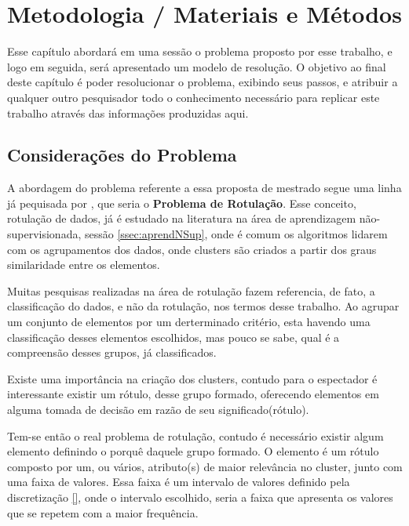 \chapter{Metodologia / Materiais e Métodos}\label{cap:ferramentas}
Esse capítulo abordará em uma sessão o problema proposto por esse trabalho, e logo em seguida, será apresentado um modelo de resolução. O objetivo ao final deste capítulo é poder resolucionar o problema, exibindo seus passos, e atribuir a qualquer outro pesquisador todo o conhecimento necessário para replicar este trabalho através das informações produzidas aqui.

\section{Considerações do Problema}\label{cap:ferramentas:sec:considproblema}

A abordagem do problema referente a essa proposta de mestrado segue uma linha já pequisada por \cite{Lopes}, que seria o \textbf{Problema de Rotulação}. Esse conceito, rotulação de dados,  já é estudado na literatura na área de aprendizagem não-supervisionada, sessão \ref{ssec:aprendNSup}, onde é comum os algoritmos lidarem com os agrupamentos dos dados, onde clusters são criados a partir dos graus similaridade entre os elementos.

Muitas pesquisas realizadas na área de rotulação fazem referencia, de fato, a classificação do dados, e não da rotulação, nos termos desse trabalho. Ao agrupar um conjunto de elementos por um derterminado critério, esta havendo uma classificação desses elementos escolhidos, mas pouco se sabe, qual é a compreensão desses grupos, já classificados. 

Existe uma importância na criação dos clusters, contudo para o espectador é interessante existir um rótulo, desse grupo formado, oferecendo elementos em alguma tomada de decisão em razão de seu significado(rótulo).

Tem-se então o real problema de rotulação, contudo é necessário existir algum elemento definindo o porquê daquele grupo formado. O elemento é um rótulo composto por um, ou vários, atributo(s) de maior relevância no cluster, junto com uma faixa de valores. Essa faixa é um intervalo de valores definido pela discretização \ref{}, onde o intervalo escolhido, seria a faixa que apresenta os valores que se repetem com a maior frequência.

